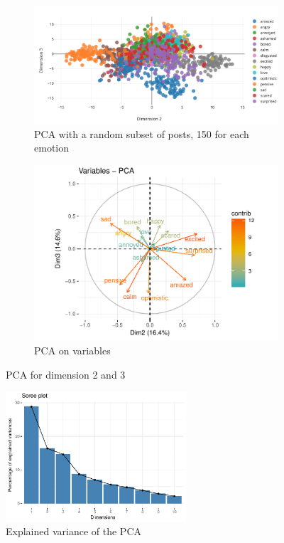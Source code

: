 \documentclass{article} %
\begin{document}
\begin{figure}[H]
    \begin{subfigure}[t]{.5\textwidth}
        \vskip 0pt %
        \centering
        \includegraphics[width=\linewidth]{Images/PCA_2vs3.png}
        \caption{PCA with a random subset of posts, 150 for each emotion}
   \end{subfigure}
   \begin{subfigure}[t]{.5\textwidth}
       \vskip 0pt
       \centering
       \includegraphics[width=\linewidth]{Images/variables_pca_2vs3.pdf}
       \caption{PCA on variables}
    \end{subfigure}
    \caption{PCA for dimension 2 and 3}
\end{figure}

\begin{figure}[H]
    \centering
    \includegraphics[width=0.6\textwidth]{Images/explained_variance.pdf}
    \caption{Explained variance of the PCA}
    \label{explained-variance}
\end{figure}
\end{document}
